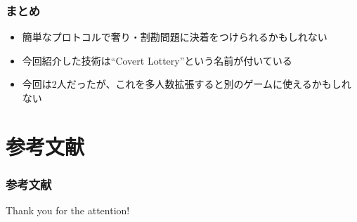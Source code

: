 \begin{frame}
  \frametitle{まとめ}

  \pause
  \begin{itemize}
    \item<+-> 簡単なプロトコルで奢り・割勘問題に決着をつけられるかもしれない

    \item<+-> 今回紹介した技術は``Covert Lottery\cite{covert_lottery}''という名前が付いている

    \item<+-> 今回は2人だったが、これを多人数拡張すると別のゲームに使えるかもしれない
  \end{itemize}
\end{frame}

\section*{参考文献}
\begin{frame}%
  \frametitle{参考文献}
  \nocite{*}
  
  
\end{frame}

\begin{frame}
  \centering
  {\Huge Thank you for the attention!}
\end{frame}


